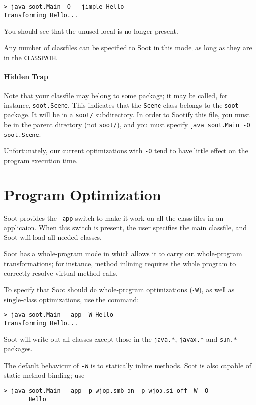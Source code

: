 \documentclass{article}
\begin{document}
\begin{verbatim}
> java soot.Main -O --jimple Hello
Transforming Hello...
\end{verbatim}

You should see that the unused local is no longer present.

Any number of classfiles can be specified to Soot in this mode, as
long as they are in the {\tt CLASSPATH}.

\paragraph{Hidden Trap} Note that your classfile may belong to some
package; it may be called, for instance, {\tt soot.Scene}.  This
indicates that the {\tt Scene} class belongs to the {\tt soot} package.
It will be in a {\tt soot/} subdirectory.  In order to Sootify this
file, you must be in the parent directory (not {\tt soot/}), and you
must specify {\tt java soot.Main -O soot.Scene}.

Unfortunately, our current optimizations with {\tt -O} tend to have
little effect on the program execution time.

\section{Program Optimization}

Soot provides the {\tt -app} switch to make it work on all the class
files in an applicaion. When this switch is present, the user specifies
the main classfile, and Soot will load all needed classes.

Soot has a whole-program mode in which allows it to carry out
whole-program transformations; for instance, method inlining requires
the whole program to correctly resolve virtual method calls.

To specify that Soot should do whole-program optimizations ({\tt -W}),
as well as single-class optimizations, use the command:

\begin{verbatim}
> java soot.Main --app -W Hello
Transforming Hello...
\end{verbatim}

Soot will write out all classes except those in the {\tt java.*},
{\tt javax.*} and {\tt sun.*} packages.

The default behaviour of {\tt -W} is to statically inline methods.
Soot is also capable of static method binding; use 

\begin{verbatim}
> java soot.Main --app -p wjop.smb on -p wjop.si off -W -O
       Hello
\end{verbatim}
\end{document}
